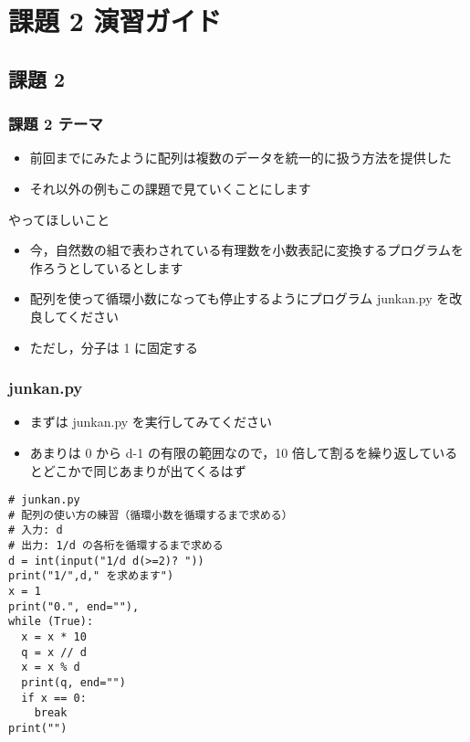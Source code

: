 %
%
\section{課題 2 演習ガイド}
\subsection{課題 2}
\begin{frame}[label=quiz2]
\frametitle{課題 2 テーマ}
  \begin{itemize}
\item 前回までにみたように配列は複数のデータを統一的に扱う方法を提供した
\item それ以外の例もこの課題で見ていくことにします
  \end{itemize}
  \begin{block}{やってほしいこと}
    \begin{itemize}
\item 今，自然数の組で表わされている有理数を小数表記に変換するプログラムを作ろうとしているとします
\item 配列を使って循環小数になっても停止するようにプログラム junkan.py を改良してください
\item ただし，分子は 1 に固定する
    \end{itemize}
  \end{block}
\end{frame}
\begin{frame}
\frametitle{junkan.py}
  \begin{itemize}
\item まずは junkan.py を実行してみてください
\item あまりは 0 から d-1 の有限の範囲なので，10 倍して割るを繰り返しているとどこかで同じあまりが出てくるはず
  \end{itemize}
  \begin{lstlisting}[caption={junkan.py},label=lst:rational]
# junkan.py
# 配列の使い方の練習（循環小数を循環するまで求める）
# 入力: d
# 出力: 1/d の各桁を循環するまで求める
d = int(input("1/d d(>=2)? "))
print("1/",d," を求めます")
x = 1
print("0.", end=""),
while (True):
  x = x * 10
  q = x // d
  x = x % d
  print(q, end="")
  if x == 0:
    break
print("")
  \end{lstlisting}
\end{frame}
